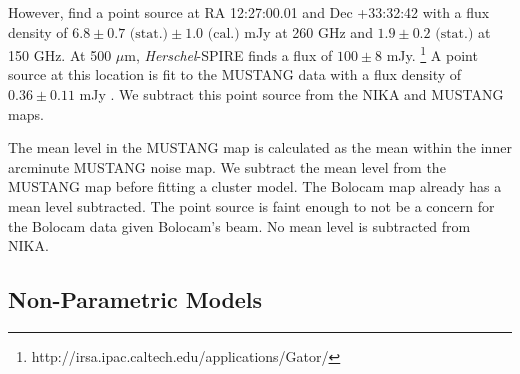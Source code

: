 \documentclass[twocolumn,traditabstract]{aa}
\begin{document}
However, \citet{adam2015} find a point source at RA 12:27:00.01 and Dec +33:32:42 with a flux density of 
$6.8 \pm 0.7 \text{ (stat.)} \pm 1.0 \text{ (cal.)}$ mJy at 260 GHz and $1.9 \pm 0.2 \text{ (stat.)}$ at 150 GHz.
At 500 $\mu$m, \emph{Herschel}-SPIRE finds a flux of $100 \pm 8$ mJy.
\footnote{{http://irsa.ipac.caltech.edu/applications/Gator/}}
A point source at this location is fit to the MUSTANG data with a flux density of $0.36 \pm 0.11$ mJy
\citep{romero2016}. We subtract this point source from the NIKA and MUSTANG maps.


The mean level in the MUSTANG map is calculated as the mean within the inner arcminute MUSTANG noise map. 
We subtract the mean level from the MUSTANG map before fitting a cluster model. The Bolocam map already has
a mean level subtracted.  The point source is faint enough to not be a concern for the Bolocam data given
Bolocam's beam. No mean level is subtracted from NIKA.

\subsection{Non-Parametric Models}
\label{sec:np_models}
\end{document}
